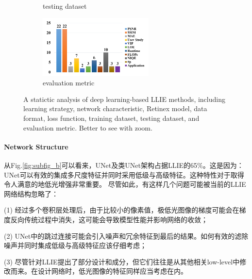 \documentclass[letterpaper,12pt]{article}
\begin{document}
\begin{figure}[htbp]
\begin{subfigure}{0.2\textwidth}
			\captionsetup{font=scriptsize}
			\caption{testing dataset}
			\label{fig:subfig_g}
		\end{subfigure}
		\begin{subfigure}{0.2\textwidth}
			\includegraphics[width=\linewidth]{evaluation_metric}
			\captionsetup{font=scriptsize}
			\caption{evaluation metric}
			\label{fig:subfig_h}	
		\end{subfigure}
		\captionsetup{font=scriptsize}
		\caption{
			\label{fig: Statictic Analysis} %
			A statictic analysis of deep learning-based LLIE methods, including learning strategy, network characteristic, Retinex model, data format, loss function, training dataset, testing dataset, and evaluation metric. Better to see with zoom.
		}
	\end{figure}
	
	
	\paragraph{Network Structure} \qquad
	
	从Fig.\ref{fig:subfig_b}可以看来，UNet及类UNet架构占据LLIE的65\%。这是因为：UNet可以有效的集成多尺度特征并同时采用低级与高级特征。这种特性对于取得令人满意的地低光增强非常重要。
	尽管如此，有这样几个问题可能被当前的LLIE网络结构忽略了：
	
	(1) 经过多个卷积层处理后，由于比较小的像素值，极低光图像的梯度可能会在梯度反向传统过程中消失，这可能会导致模型性能并影响网络的收敛；
	
	(2) UNet中的跳过连接可能会引入噪声和冗余特征到最后的结果。如何有效的滤除噪声并同时集成低级与高级特征应该仔细考虑；
	
	(3) 尽管针对LLIE提出了部分设计和成分，但它们往往是从其他相关low-level中修改而来。在设计网络时，低光图像的特征同样应当考虑在内。
	
\end{document}
